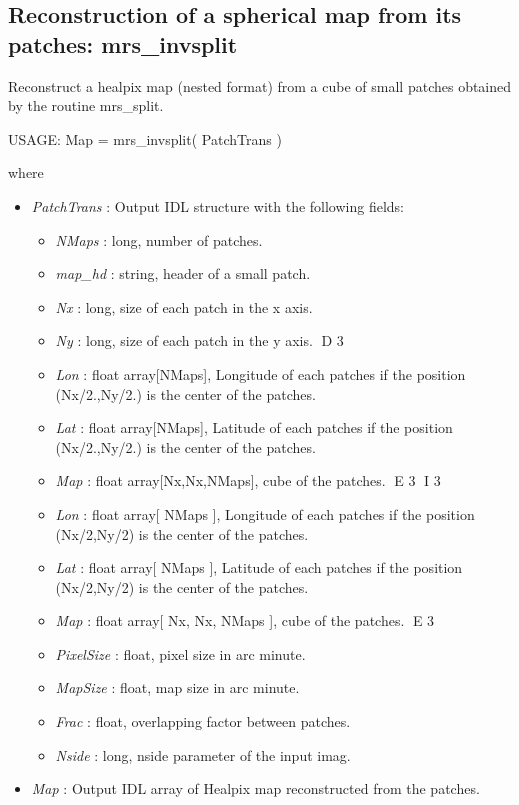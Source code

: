 \subsection{Reconstruction of a spherical map from its patches: mrs\_invsplit}
Reconstruct a healpix map (nested format) from a cube of small patches obtained by the routine mrs\_split.
{\bf
\begin{center}
     USAGE: Map = mrs\_invsplit( PatchTrans )
\end{center}}
where
\begin{itemize}
\item {\em PatchTrans} : Output IDL structure with the following fields:
\begin{itemize}
\item {\em NMaps} : long, number of patches.
\item {\em map\_hd} : string, header of a small patch.
\item {\em Nx} : long, size of each patch in the x axis.
\item {\em Ny} : long, size of each patch in the y axis.
D 3
\item {\em Lon} : float array[NMaps], Longitude of each patches if the position (Nx/2.,Ny/2.) is the center of the patches.
\item {\em Lat} : float array[NMaps], Latitude of each patches if the position (Nx/2.,Ny/2.) is the center of the patches.
\item {\em Map} : float array[Nx,Nx,NMaps], cube of the patches.
E 3
I 3
\item {\em Lon} : float array[ NMaps ], Longitude of each patches if the position (Nx/2,Ny/2) is the center of the patches.
\item {\em Lat} : float array[ NMaps ], Latitude of each patches if the position (Nx/2,Ny/2) is the center of the patches.
\item {\em Map} : float array[ Nx, Nx, NMaps ], cube of the patches.
E 3
\item {\em PixelSize} : float, pixel size in arc minute.
\item {\em MapSize} : float, map size in arc minute.
\item {\em Frac} : float, overlapping factor between patches.
\item {\em Nside} : long, nside parameter of the input imag.
\end{itemize}
\item {\em Map} : Output IDL array of Healpix map reconstructed from the patches.
\end{itemize}

